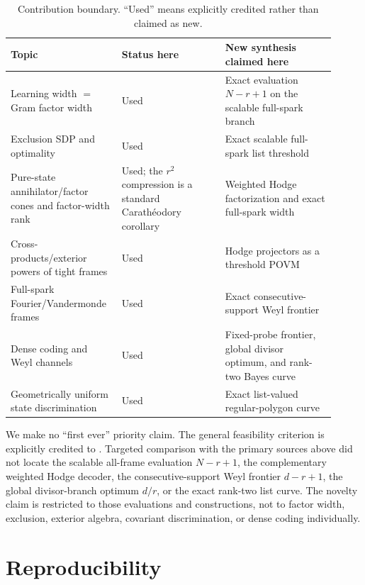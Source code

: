 \documentclass[11pt,a4paper]{article}
\begin{document}
\begin{table}[t]
\centering
\small
\caption{Contribution boundary.  ``Used'' means explicitly credited rather
than claimed as new.}
\label{tab:prior}
\begin{tabular}{@{}>{\raggedright\arraybackslash}p{0.29\linewidth}
                    >{\raggedright\arraybackslash}p{0.30\linewidth}
                    >{\raggedright\arraybackslash}p{0.32\linewidth}@{}}
\toprule
Topic & Status here & New synthesis claimed here\\
\midrule
Learning width $=$ Gram factor width & Used
& Exact evaluation $N-r+1$ on the scalable full-spark branch\\
Exclusion SDP and optimality & Used
& Exact scalable full-spark list threshold\\
Pure-state annihilator/factor cones and factor-width rank & Used; the $r^2$
compression is a standard Carath\'eodory corollary
& Weighted Hodge factorization and exact full-spark width\\
Cross-products/exterior powers of tight frames & Used
& Hodge projectors as a threshold POVM\\
Full-spark Fourier/Vandermonde frames & Used
& Exact consecutive-support Weyl frontier\\
Dense coding and Weyl channels & Used
& Fixed-probe frontier, global divisor optimum, and rank-two Bayes curve\\
Geometrically uniform state discrimination & Used
& Exact list-valued regular-polygon curve\\
\bottomrule
\end{tabular}
\end{table}

We make no ``first ever'' priority claim.  The general feasibility criterion
is explicitly credited to \cite{JohnstonLovitzRussoSikora2025}.  Targeted
comparison with the primary sources above did not locate the scalable
all-frame evaluation $N-r+1$, the complementary weighted Hodge decoder, the
consecutive-support Weyl frontier $d-r+1$, the global divisor-branch optimum
$d/r$, or the exact rank-two list curve.
The novelty claim is restricted to those evaluations and constructions, not
to factor width, exclusion, exterior algebra, covariant discrimination, or
dense coding individually.

\section{Reproducibility}
\end{document}
